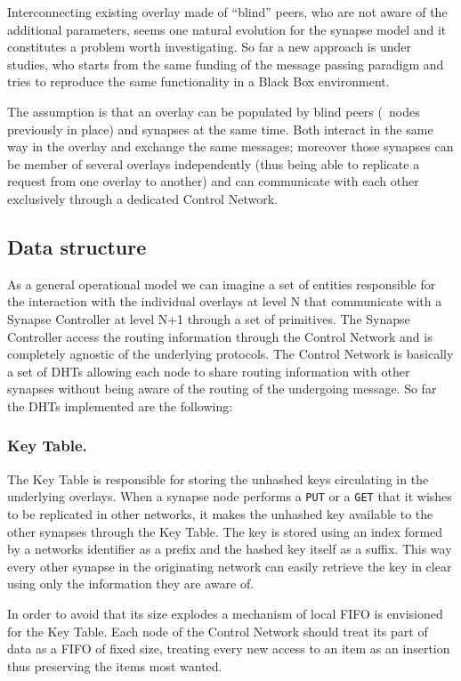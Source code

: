 Interconnecting existing overlay made of ``blind'' peers, who are not
aware of the additional parameters, seems one natural evolution for
the synapse model and it constitutes a problem worth investigating. So
far a new approach is under studies, who starts from the same funding
of the message passing paradigm and tries to reproduce the same
functionality in a Black Box environment.

The assumption is that an overlay can be populated by blind peers
(\eg\ nodes previously in place) and synapses at the same time.  Both
interact in the same way in the overlay and exchange the same
messages; moreover those synapses can be member of several overlays
independently (thus being able to replicate a request from one overlay
to another) and can communicate with each other exclusively through a
dedicated Control Network.

\subsection{Data structure}
%
As a general operational model we can imagine a set of entities
responsible for the interaction with the individual overlays at level
N that communicate with a Synapse Controller at level N+1 through a
set of primitives. The Synapse Controller access the routing
information through the Control Network and is completely agnostic of
the underlying protocols. The Control Network is basically a set of
DHTs allowing each node to share routing information with other
synapses without being aware of the routing of the undergoing
message. So far the DHTs implemented are the following:

\subsubsection{Key Table.}
%
The Key Table is responsible for storing the unhashed keys circulating
in the underlying overlays.  When a synapse node performs a {\tt PUT}
or a {\tt GET} that it wishes to be replicated in other networks, it
makes the unhashed key available to the other synapses through the Key
Table. The key is stored using an index formed by a networks
identifier as a prefix and the hashed key itself as a suffix. This way
every other synapse in the originating network can easily retrieve the
key in clear using only the information they are aware of.

In order to avoid that its size explodes a mechanism of local FIFO is
envisioned for the Key Table. Each node of the Control Network should
treat its part of data as a FIFO of fixed size, treating every new
access to an item as an insertion thus preserving the items most
wanted.

